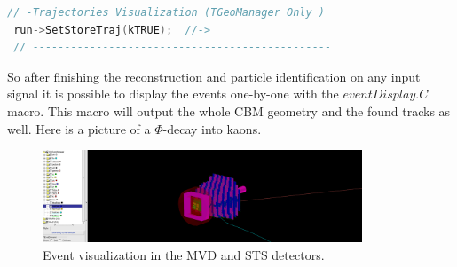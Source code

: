 \documentclass[a4paper,12pt]{article}
\begin{document}
\begin{lstlisting}[language=C++]
 // -Trajectories Visualization (TGeoManager Only )
 run->SetStoreTraj(kTRUE);  //->
 // -----------------------------------------------
\end{lstlisting}
\par So after finishing the reconstruction and particle identification on any input signal it is possible to display the events one-by-one with the $eventDisplay.C$ macro. This macro will output the whole CBM geometry and the found tracks as well. Here is a picture of a $\Phi$-decay into kaons.
\begin{figure}[H]
	\centering
	\includegraphics[width=0.85\textwidth]{k-k+decayofphi.png}
	\caption{ Event visualization in the MVD and STS detectors. }
\end{figure}
\end{document}
